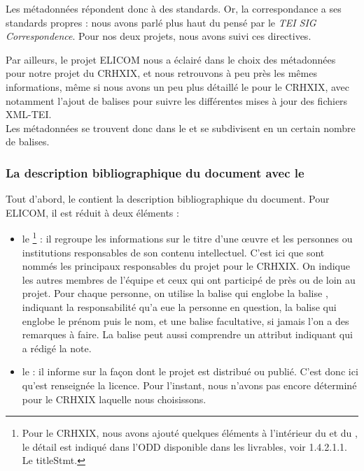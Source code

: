 Les métadonnées répondent donc à des standards. Or, la correspondance a ses standards propres : nous avons parlé plus haut du  pensé par le \emph{TEI SIG Correspondence}. Pour nos deux projets, nous avons suivi ces directives.

Par ailleurs, le projet ELICOM nous a éclairé dans le choix des métadonnées pour notre projet du CRHXIX, et nous retrouvons à peu près les mêmes informations, même si nous avons un peu plus détaillé le  pour le CRHXIX, avec notamment l'ajout de balises pour suivre les différentes mises à jour des fichiers XML-TEI.\\

Les métadonnées se trouvent donc dans le  et se subdivisent en un certain nombre de balises.\\

\subsubsection{La description bibliographique du document avec le }
Tout d'abord, le  contient la description bibliographique du document. Pour ELICOM, il est réduit à deux éléments : \begin{itemize}
    \item le \footnote{Pour le CRHXIX, nous avons ajouté quelques éléments à l'intérieur du  et du , le détail est indiqué dans l'ODD disponible dans les livrables, voir 1.4.2.1.1. Le titleStmt.} : il regroupe les informations sur le titre d’une œuvre et les personnes ou institutions responsables de son contenu intellectuel. C'est ici que sont nommés les principaux responsables du projet pour le CRHXIX. On indique les autres membres de l'équipe et ceux qui ont participé de près ou de loin au projet. Pour chaque personne, on utilise la balise qui englobe la balise , indiquant la responsabilité qu'a eue la personne en question, la balise  qui englobe le prénom puis le nom, et une balise  facultative, si jamais l'on a des remarques à faire. La balise  peut aussi comprendre un attribut  indiquant qui a rédigé la note.
    
    \item le  : il informe sur la façon dont le projet est distribué ou publié. C'est donc ici qu'est renseignée la licence. Pour l'instant, nous n'avons pas encore déterminé pour le CRHXIX laquelle nous choisissons.
\end{itemize}


